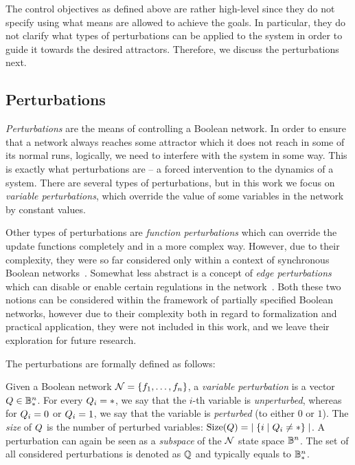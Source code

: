 The control objectives as defined above are rather high-level since they do not specify using what means are allowed to achieve the goals. In particular, they do not clarify what types of perturbations can be applied to the system in order to guide it towards the desired attractors. Therefore, we discuss the perturbations next.

\subsection{Perturbations}
\label{subsec:perturbations}
\emph{Perturbations} are the means of controlling a Boolean network. In order to ensure that a network always reaches some attractor which it does not reach in some of its normal runs, logically, we need to interfere with the system in some way. This is exactly what perturbations are -- a forced intervention to the dynamics of a system. There are several types of perturbations, but in this work we focus on \emph{variable perturbations}, which override the value of some variables in the network by constant values. 

Other types of perturbations are \emph{function perturbations} which can override the update functions completely and in a more complex way. However, due to their complexity, they were so far considered only within a context of synchronous Boolean networks~\cite{Liu2017, Xiao2007}. Somewhat less abstract is a concept of \emph{edge perturbations} which can disable or enable certain regulations in the network~\cite{Fontanals2022c}. Both these two notions can be considered within the framework of partially specified Boolean networks, however due to their complexity both in regard to formalization and practical application, they were not included in this work, and we leave their exploration for future research.

The perturbations are formally defined as follows:

\begin{definition}
\label{def:perturbation}
Given a Boolean network $\mathcal{N} = \{f_1, \dots, f_n \}$, a \emph{variable perturbation} is a vector $Q \in \mathbb{B}_{{*}}^n$. For every $Q_i = {*}$, we say that the $i$-th variable is \emph{unperturbed}, whereas for $Q_i = 0$ or $Q_i = 1$, we say that the variable is \emph{perturbed} (to either $0$ or $1$). The \emph{size} of $Q$ is the number of perturbed variables: $\text{Size}(Q) = \; \mid \{ i \mid Q_i \neq {*} \} \mid$. A perturbation can again be seen as a \emph{subspace} of the $\mathcal{N}$ state space $\mathbb{B}^n$. The set of all considered perturbations is denoted as $\mathbb{Q}$ and typically equals to $\mathbb{B}_{{*}}^n$. 
\end{definition}

